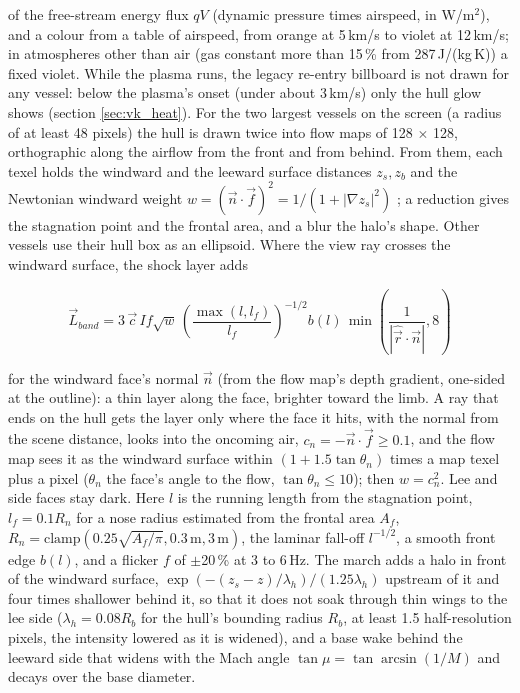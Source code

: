\documentclass[Orbiter Technical Reference.tex]{subfiles}
\begin{document}
\begin{sloppypar}
\noindent
of the free-stream energy flux $qV$ (dynamic pressure times airspeed, in W/m$^{2}$), and a colour from a table of airspeed, from orange at 5\,km/s to violet at 12\,km/s; in atmospheres other than air (gas constant more than 15\,\% from 287\,J/(kg\,K)) a fixed violet. While the plasma runs, the legacy re-entry billboard is not drawn for any vessel: below the plasma's onset (under about 3\,km/s) only the hull glow shows (section \ref{sec:vk_heat}). For the two largest vessels on the screen (a radius of at least 48 pixels) the hull is drawn twice into flow maps of 128 $\times$ 128, orthographic along the airflow from the front and from behind. From them, each texel holds the windward and the leeward surface distances $z_{s}, z_{b}$ and the Newtonian windward weight $w = (\vec{n}\cdot\vec{f})^{2} = 1/(1 + |\nabla z_{s}|^{2})$ \cite{lees1955}; a reduction gives the stagnation point and the frontal area, and a blur the halo's shape. Other vessels use their hull box as an ellipsoid. Where the view ray crosses the windward surface, the shock layer adds

\[ \vec{L}_{band} = 3\,\vec{c}\,I f \sqrt{w}\,\left(\frac{\max(l, l_{f})}{l_{f}}\right)^{-1/2} b(l)\, \min\left(\frac{1}{|\hat{\vec{r}}\cdot\vec{n}|}, 8\right) \]

\noindent
for the windward face's normal $\vec{n}$ (from the flow map's depth gradient, one-sided at the outline): a thin layer along the face, brighter toward the limb. A ray that ends on the hull gets the layer only where the face it hits, with the normal from the scene distance, looks into the oncoming air, $c_{n} = -\vec{n}\cdot\vec{f} \ge 0.1$, and the flow map sees it as the windward surface within $(1 + 1.5\tan\theta_{n})$ times a map texel plus a pixel ($\theta_{n}$ the face's angle to the flow, $\tan\theta_{n} \le 10$); then $w = c_{n}^{2}$. Lee and side faces stay dark. Here $l$ is the running length from the stagnation point, $l_{f} = 0.1R_{n}$ for a nose radius estimated from the frontal area $A_{f}$, $R_{n} = \mathrm{clamp}(0.25\sqrt{A_{f}/\pi}, 0.3\,\mathrm{m}, 3\,\mathrm{m})$, the laminar fall-off $l^{-1/2}$, a smooth front edge $b(l)$, and a flicker $f$ of $\pm$20\,\% at 3 to 6\,Hz. The march adds a halo in front of the windward surface, $\exp(-(z_{s} - z)/\lambda_{h})/(1.25\lambda_{h})$ upstream of it and four times shallower behind it, so that it does not soak through thin wings to the lee side ($\lambda_{h} = 0.08R_{b}$ for the hull's bounding radius $R_{b}$, at least 1.5 half-resolution pixels, the intensity lowered as it is widened), and a base wake behind the leeward side that widens with the Mach angle $\tan\mu = \tan\arcsin(1/M)$ and decays over the base diameter.



\end{sloppypar}
\end{document}
